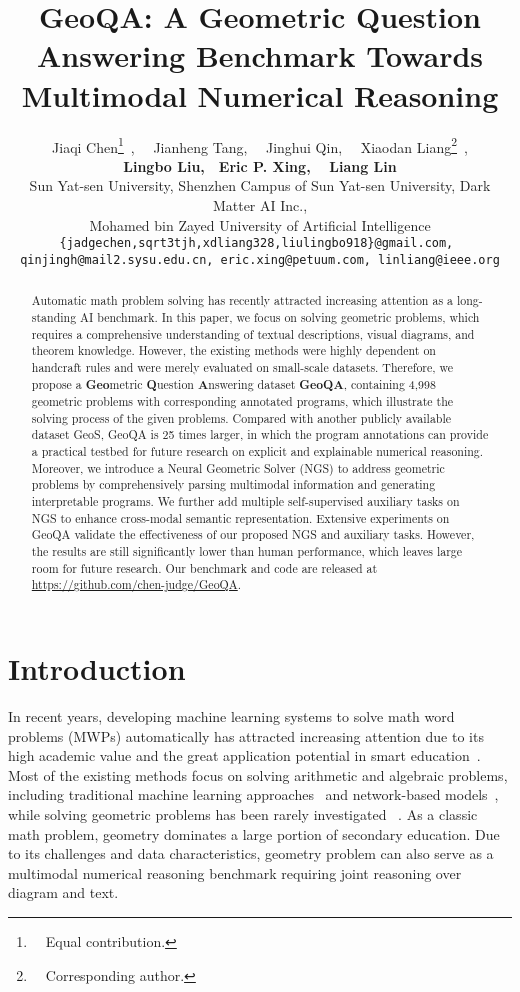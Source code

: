 \documentclass[11pt,a4paper]{article}
\title{GeoQA: A Geometric Question Answering Benchmark Towards Multimodal Numerical Reasoning}
\author{Jiaqi Chen\thanks{~~Equal contribution.}~,~~ Jianheng Tang,~~ Jinghui Qin,~~ Xiaodan Liang\thanks{~~Corresponding author.}~, \\ 
{\bf Lingbo Liu}{\bf ,}~~{\bf Eric P. Xing}{\bf ,}~~ {\bf Liang Lin} \\
{\small Sun Yat-sen University, Shenzhen Campus of Sun Yat-sen University, Dark Matter AI Inc., } \\
{\small Mohamed bin Zayed University of Artificial Intelligence}\\
{\small\texttt{\{jadgechen,sqrt3tjh,xdliang328,liulingbo918\}@gmail.com, }}\\
{\small\texttt{qinjingh@mail2.sysu.edu.cn, eric.xing@petuum.com, linliang@ieee.org}}
}
\begin{document}
\maketitle
\begin{abstract}


Automatic math problem solving has recently attracted increasing attention as a long-standing AI benchmark. In this paper, we focus on solving geometric problems, which requires a comprehensive understanding of textual descriptions, visual diagrams, and theorem knowledge. However, the existing methods were highly dependent on handcraft rules and were merely evaluated on small-scale datasets.
Therefore, we propose a \textbf{Geo}metric \textbf{Q}uestion \textbf{A}nswering dataset \textbf{GeoQA}, containing 4,998 geometric problems with corresponding annotated programs, which illustrate the solving process of the given problems. Compared with another publicly available dataset GeoS, GeoQA is 25 times larger, in which the program annotations can provide a practical testbed for future research on explicit and explainable numerical reasoning.
Moreover, we introduce a Neural Geometric Solver (NGS) to address geometric problems by comprehensively parsing multimodal information and generating interpretable programs. We further add multiple self-supervised auxiliary tasks on NGS to enhance cross-modal semantic representation.
Extensive experiments on GeoQA validate the effectiveness of our proposed NGS and auxiliary tasks. However, the results are still significantly lower than human performance, which leaves large room for future research.
Our benchmark and code are released at \href{https://github.com/chen-judge/GeoQA}{https://github.com/chen-judge/GeoQA}.


\end{abstract}



\section{Introduction}





In recent years, developing machine learning systems to solve math word problems (MWPs) automatically has attracted increasing attention due to its high academic value and the great application potential in smart education~\cite{bajaj2018smart,lin2018intelligent}. Most of the existing methods focus on solving arithmetic and algebraic problems, including traditional machine learning approaches~\cite{kushman2014learning, zhou-etal-2015-learn, huang-etal-2016-well} and network-based models~\cite{dns, seq2et, seq2tree}, while solving geometric problems has been rarely investigated ~\cite{seo2014diagram,seo2015solving,sachan2017textbooks}. 
As a classic math problem, geometry dominates a large portion of  secondary education. Due to its challenges and data characteristics, geometry problem can also serve as a multimodal numerical reasoning benchmark requiring joint reasoning over diagram and text.
\end{document}
